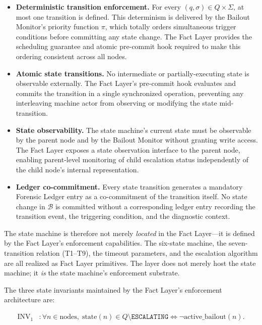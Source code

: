 \begin{itemize}\itemsep=0pt
\item[(\textit{i})] \textbf{Deterministic transition enforcement.} For every $(q, \sigma) \in Q \times \Sigma$, at most one transition is defined. This determinism is delivered by the Bailout Monitor's priority function $\pi$, which totally orders simultaneous trigger conditions before committing any state change. The Fact Layer provides the scheduling guarantee and atomic pre-commit hook required to make this ordering consistent across all nodes.

\item[(\textit{ii})] \textbf{Atomic state transitions.} No intermediate or partially-executing state is observable externally. The Fact Layer's pre-commit hook evaluates and commits the transition in a single synchronized operation, preventing any interleaving machine actor from observing or modifying the state mid-transition.

\item[(\textit{iii})] \textbf{State observability.} The state machine's current state must be observable by the parent node and by the Bailout Monitor without granting write access. The Fact Layer exposes a state observation interface to the parent node, enabling parent-level monitoring of child escalation status independently of the child node's internal representation.

\item[(\textit{iv})] \textbf{Ledger co-commitment.} Every state transition generates a mandatory Forensic Ledger entry as a co-commitment of the transition itself. No state change in $\mathcal{B}$ is committed without a corresponding ledger entry recording the transition event, the triggering condition, and the diagnostic context.
\end{itemize}

The state machine is therefore not merely \emph{located} in the Fact Layer---it is defined by the Fact Layer's enforcement capabilities. The six-state machine, the seven-transition relation (T1--T9), the timeout parameters, and the escalation algorithm are all realized as Fact Layer primitives. The \fact{} layer does not merely host the state machine; it \emph{is} the state machine's enforcement substrate.

The three state invariants maintained by the Fact Layer's enforcement architecture are:

\begin{align}
\text{INV}_1 &: \forall n \in \text{nodes},\; \text{state}(n) \in Q \setminus \texttt{ESCALATING} \iff \neg\text{active\_bailout}(n). \tag{INV-1}
\end{align}

